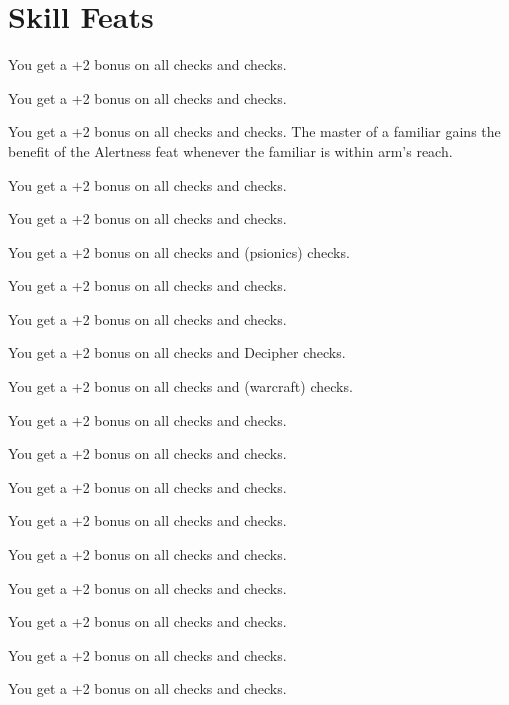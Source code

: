 \section{Skill Feats}

{You get a +2 bonus on all  checks and  checks.}

{You get a +2 bonus on all  checks and  checks.}

{You get a +2 bonus on all  checks and  checks.}
{}
{The master of a familiar gains the benefit of the Alertness feat whenever the familiar is within arm's reach.}

{You get a +2 bonus on all  checks and  checks.}

{You get a +2 bonus on all  checks and  checks.}

{You get a +2 bonus on all  checks and  (psionics) checks.}

{You get a +2 bonus on all  checks and  checks.}

{You get a +2 bonus on all  checks and  checks.}

{You get a +2 bonus on all  checks and Decipher  checks.}

{You get a +2 bonus on all  checks and  (warcraft) checks.}

{You get a +2 bonus on all  checks and  checks.}

{You get a +2 bonus on all  checks and  checks.}

{You get a +2 bonus on all  checks and  checks.}

{You get a +2 bonus on all  checks and  checks.}

{You get a +2 bonus on all  checks and  checks.}

{You get a +2 bonus on all  checks and  checks.}

{You get a +2 bonus on all  checks and  checks.}

{You get a +2 bonus on all  checks and  checks.}

{You get a +2 bonus on all  checks and  checks.}